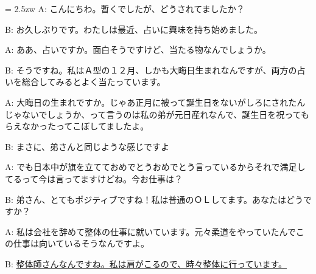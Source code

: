 \documentclass[11pt]{amsart}
\title{}
\author{}
\newenvironment{hangall}[1]{\hangindent = 2.5zw\everypar{\hangindent = 2.5zw}}{}
\begin{document}
\maketitle
\begin{hangall}{}%
A: こんにちわ。暫くでしたが、どうされてましたか？

B: お久しぶりです。わたしは最近、占いに興味を持ち始めました。

A: ああ、占いですか。面白そうですけど、当たる物なんでしょうか。

B: そうですね。私はＡ型の１２月、しかも大晦日生まれなんですが、両方の占いを総合してみるとよく当たっています。

A: 大晦日の生まれですか。じゃあ正月に被って誕生日をないがしろにされたんじゃないでしょうか、って言うのは私の弟が元日産れなんで、誕生日を祝ってもらえなかったってこぼしてましたよ。

B: まさに、弟さんと同じような感じですよ

A: でも日本中が旗を立てておめでとうおめでとう言っているからそれで満足してるって今は言ってますけどね。今お仕事は？

B: 弟さん、とてもポジティブですね！私は普通のＯＬしてます。あなたはどうですか？

A: 私は会社を辞めて整体の仕事に就いています。元々柔道をやっていたんでこの仕事は向いているそうなんですよ。

B: \ul{整体師さんなんですね。私は肩がこるので、時々整体に行っています。}\end{hangall}
\end{document}

